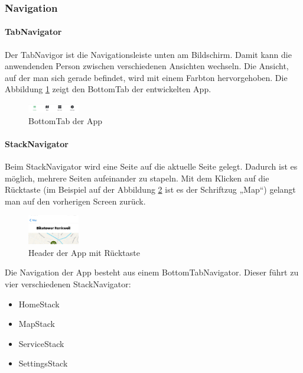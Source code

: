 \subsubsection{Navigation}
\paragraph{TabNavigator} Der TabNavigor ist die Navigationsleiste unten am Bildschirm. Damit kann die anwendenden Person zwischen verschiedenen Ansichten wechseln. Die Ansicht, auf der man sich gerade befindet, wird mit einem Farbton hervorgehoben. Die Abbildung \ref{fig:bottomtab} zeigt den BottomTab der entwickelten App.  \\
\begin{figure}[H]
    \centering
    \includegraphics[width=0.2\textwidth]{images/tab.png}
    \caption{BottomTab der App}
    \label{fig:bottomtab}
\end{figure}

\paragraph{StackNavigator}Beim StackNavigator wird eine Seite auf die aktuelle Seite gelegt. Dadurch ist es möglich, mehrere Seiten aufeinander zu stapeln. Mit dem Klicken auf die Rücktaste (im Beispiel auf der Abbildung \ref{fig:appheader} ist es der Schriftzug „Map“) gelangt man auf den vorherigen Screen zurück.  \\
\begin{figure}[H]
    \centering
    \includegraphics[width=0.2\textwidth]{images/appheader.png}
    \caption{Header der App mit Rücktaste}
    \label{fig:appheader}
\end{figure}


Die Navigation der App besteht aus einem BottomTabNavigator. Dieser führt zu vier verschiedenen StackNavigator:\\
\begin{itemize}
    \item HomeStack
    \item MapStack
    \item ServiceStack
    \item SettingsStack
\end{itemize}

